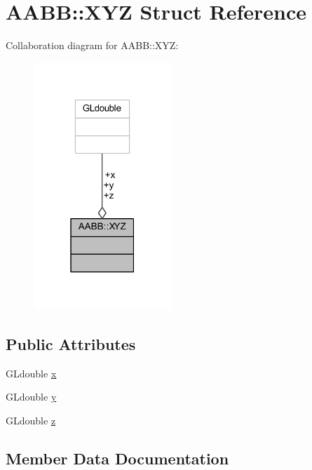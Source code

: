 \hypertarget{struct_a_a_b_b_1_1_x_y_z}{}\section{A\+A\+BB\+:\+:X\+YZ Struct Reference}
\label{struct_a_a_b_b_1_1_x_y_z}


Collaboration diagram for A\+A\+BB\+:\+:X\+YZ\+:
\nopagebreak
\begin{figure}[H]
\begin{center}
\leavevmode
\includegraphics[width=147pt]{struct_a_a_b_b_1_1_x_y_z__coll__graph}
\end{center}
\end{figure}
\subsection*{Public Attributes}
\begin{DoxyCompactItemize}
\item 
G\+Ldouble \hyperlink{struct_a_a_b_b_1_1_x_y_z_ae8cfad188494bd7f2e3f6ef7d166e33c}{x}
\item 
G\+Ldouble \hyperlink{struct_a_a_b_b_1_1_x_y_z_a5ad8f1a60153a4c3fd58a60a06a5100d}{y}
\item 
G\+Ldouble \hyperlink{struct_a_a_b_b_1_1_x_y_z_a6601b017a897d082c777cd6f08af2399}{z}
\end{DoxyCompactItemize}


\subsection{Member Data Documentation}

